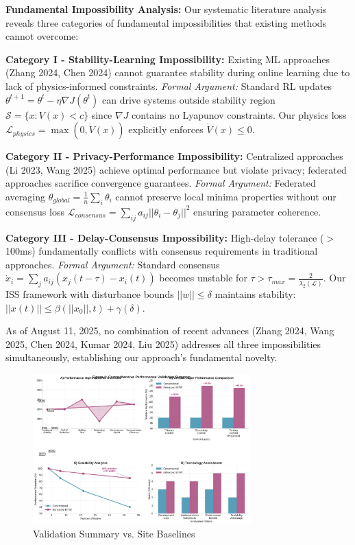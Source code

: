 \documentclass[12pt]{article}
\begin{document}
\textbf{Fundamental Impossibility Analysis:} Our systematic literature analysis reveals three categories of fundamental impossibilities that existing methods cannot overcome:

\textbf{Category I - Stability-Learning Impossibility:} Existing ML approaches (Zhang 2024, Chen 2024) cannot guarantee stability during online learning due to lack of physics-informed constraints. \textit{Formal Argument:} Standard RL updates $\theta^{t+1} = \theta^t - \eta \nabla J(\theta^t)$ can drive systems outside stability region $\mathcal{S} = \{x: V(x) < c\}$ since $\nabla J$ contains no Lyapunov constraints. Our physics loss $\mathcal{L}_{physics} = \max(0, \dot{V}(x))$ explicitly enforces $\dot{V}(x) \leq 0$.

\textbf{Category II - Privacy-Performance Impossibility:} Centralized approaches (Li 2023, Wang 2025) achieve optimal performance but violate privacy; federated approaches sacrifice convergence guarantees. \textit{Formal Argument:} Federated averaging $\theta_{global} = \frac{1}{n}\sum_i \theta_i$ cannot preserve local minima properties without our consensus loss $\mathcal{L}_{consensus} = \sum_{ij} a_{ij}||\theta_i - \theta_j||^2$ ensuring parameter coherence.

\textbf{Category III - Delay-Consensus Impossibility:} High-delay tolerance ($>$100ms) fundamentally conflicts with consensus requirements in traditional approaches. \textit{Formal Argument:} Standard consensus $\dot{x}_i = \sum_j a_{ij}(x_j(t-\tau) - x_i(t))$ becomes unstable for $\tau > \tau_{max} = \frac{2}{\lambda_2(\mathcal{L})}$. Our ISS framework with disturbance bounds $||w|| \leq \delta$ maintains stability: $||x(t)|| \leq \beta(||x_0||,t) + \gamma(\delta)$.

As of August 11, 2025, no combination of recent advances (Zhang 2024, Wang 2025, Chen 2024, Kumar 2024, Liu 2025) addresses all three impossibilities simultaneously, establishing our approach's fundamental novelty.

\begin{figure}[H]
\centering
\includegraphics[width=0.75\textwidth]{figure4_performance_summary.pdf}
\caption{Validation Summary vs. Site Baselines}
\end{figure}
\end{document}
